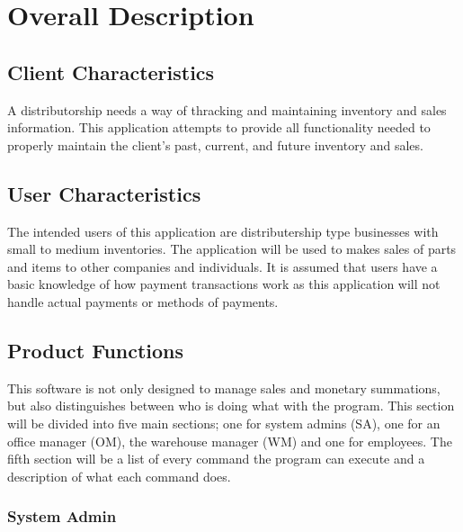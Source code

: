 \documentclass{report}
\begin{document}
\section{Overall Description}

\subsection{Client Characteristics}

A distributorship needs a way of thracking and maintaining inventory and sales information. This application attempts to provide all functionality needed to properly maintain the client's past, current, and future inventory and sales.\par

\subsection{User Characteristics}

The intended users of this application are distributership type businesses with small to medium inventories. The application will be used to makes sales of parts and items to other companies and individuals. It is assumed that users have a basic knowledge of how payment transactions work as this application will not handle actual payments or methods of payments.\par

\subsection{Product Functions}

This software is not only designed to manage sales and monetary summations, but also distinguishes between who is doing what with the program. This section will be divided into five main sections; one for system admins (SA), one for an office manager (OM), the warehouse manager (WM) and one for employees. The fifth section will be a list of every command the program can execute and a description of what each command does.\par

\subsubsection{System Admin}
\end{document}
